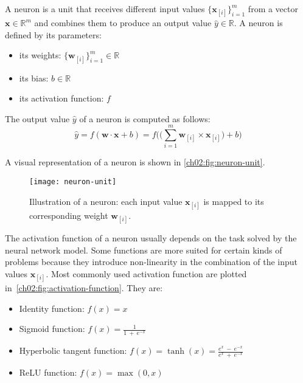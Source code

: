     \theoremstyle{definition}
    \begin{definition}[A neuron]
      A neuron is a unit that receives different input values
      $\{\mathbf{x}_{[i]}\}_{i = 1}^m$ from a vector $\mathbf{x} \in
      \mathbb{R}^m$ and combines them to produce an output value $\hat{y} \in
      \mathbb{R}$. A neuron is defined by its parameters:
      \begin{itemize}
        \item its weights: $\{\mathbf{w}_{[i]}\}_{i = 1}^m \in \mathbb{R}$
        \item its bias: $b \in \mathbb{R}$
        \item its activation function: $f$
      \end{itemize}
      The output value $\hat{y}$ of a neuron is computed as follows:
      \begin{equation}
        \hat{y} = f(\mathbf{w} \cdot \mathbf{x} + b)
                = f\Big(
                \big(\sum_{i=1}^m \mathbf{w}_{[i]} \times \mathbf{x}_{[i]}\big)
                + b\Big)
      \end{equation}
    \end{definition}

    \noindent A visual representation of a neuron is shown in
    \autoref{ch02:fig:neuron-unit}.

    \begin{figure}[h!]
      \centering
      \texttt{[image: neuron-unit]}
      \caption[Illustration of a neuron.]
      {Illustration of a neuron: each input value $\mathbf{x}_{[i]}$ is mapped
      to its corresponding weight $\mathbf{w}_{[i]}$.}
      \label{ch02:fig:neuron-unit}
    \end{figure}

    \pagebreak
    The activation function of a neuron usually depends on the task
    solved by the neural network model. Some functions are more suited for
    certain kinds of problems because they introduce non-linearity in the
    combination of the input values $\mathbf{x}_{[i]}$. Most commonly used
    activation function are plotted in~\autoref{ch02:fig:activation-function}.
    They are:
    \begin{itemize}
      \item Identity function: $f(x) = x$
      \item Sigmoid function: $f(x) = \frac{1}{1~+~e^{-x}}$
      \item Hyperbolic tangent function:
        $f(x) = \tanh(x) = \frac{e^x~-~e^{-x}}{e^x~+~e^{-x}}$
      \item ReLU function: $f(x) = \max(0, x)$
    \end{itemize}

